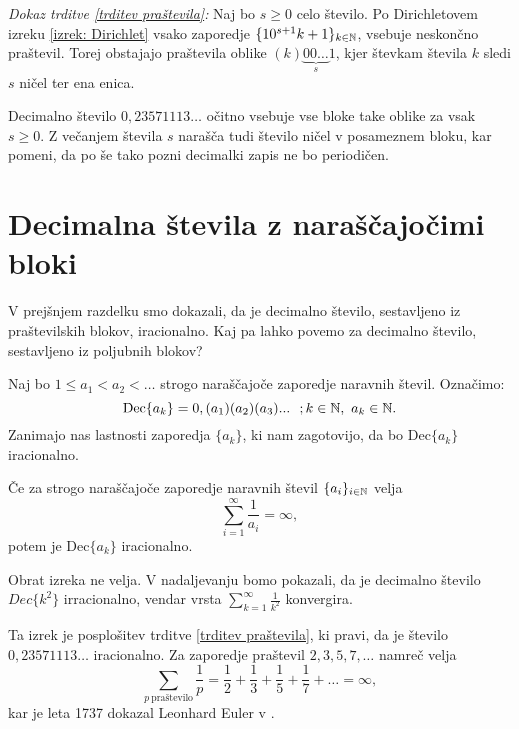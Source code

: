 \documentclass[twoside,11pt]{article}
\begin{document}
\noindent
{\em Dokaz trditve \ref{trditev praštevila}:\/} Naj bo $s \geq 0$ celo število. 
Po Dirichletovem izreku \ref{izrek: Dirichlet} vsako zaporedje
$ \{10^{s+1}k + 1 \}_{k \in \mathbb{N}}$,  vsebuje neskončno praštevil. Torej obstajajo praštevila
oblike $(k)\underbrace{00 \dots}_{s}1$, kjer števkam števila $k$ sledi $s$ ničel ter ena enica. 

Decimalno število $0{,}23571113\dots$ očitno vsebuje vse bloke take oblike za vsak $s \geq 0$. Z večanjem števila
$s$ narašča tudi število ničel v posameznem bloku, kar pomeni, da po še tako pozni decimalki zapis ne bo periodičen.
\QED


\section{Decimalna števila z naraščajočimi bloki}

V prejšnjem razdelku smo dokazali, da je decimalno število, sestavljeno iz praštevilskih
blokov, iracionalno. Kaj pa lahko povemo za decimalno število, sestavljeno iz poljubnih blokov?

Naj bo $1 \leq a_1 < a_2 < \dots $ strogo naraščajoče zaporedje naravnih števil. 
Označimo: \[\text{Dec}\{a_k\} = 0,(a_1)(a_2)(a_3)... \  \ ; k \in \mathbb{N}, \ a_k \in \mathbb{N} . \]
Zanimajo nas lastnosti zaporedja $\{a_k\}$, ki nam zagotovijo, da bo $\text{Dec}\{a_k\}$ iracionalno.

\begin{izrek}\label{irac1}
    
    Če za strogo naraščajoče zaporedje naravnih števil $\{a_i\}_{i \in \mathbb{N}}$ velja 
    \[ \sum_{i=1}^{\infty} \frac{1}{a_i} = \infty ,\]
    potem je $\text{Dec}\{a_k\}$ iracionalno.
\end{izrek}

\begin{opomba}
    Obrat izreka ne velja. V nadaljevanju bomo pokazali, da je decimalno število $Dec\{k^2\}$ irracionalno,
    vendar vrsta $\sum_{k=1}^{\infty}\frac{1}{k^2}$ konvergira.
\end{opomba}

Ta izrek je posplošitev trditve \ref{trditev praštevila}, ki pravi, da je število $0{,}23571113 \dots$
iracionalno. Za zaporedje praštevil $2, 3, 5, 7, \dots$ namreč velja
\[
    \sum_{p \ \text{praštevilo}}\frac{1}{p} = \frac{1}{2} + \frac{1}{3} + \frac{1}{5} + \frac{1}{7} + \dots = \infty ,\]
kar je leta 1737 dokazal Leonhard Euler v \cite{Eul}.
\end{document}

